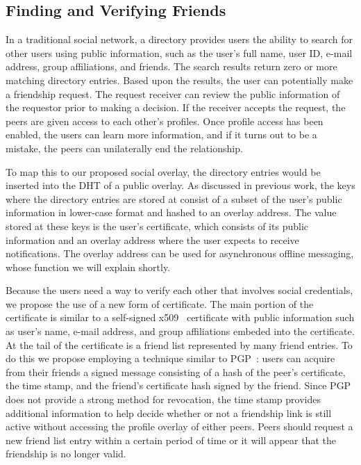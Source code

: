 \documentclass[letterpaper,twocolumn,10pt]{article}
\begin{document}
\subsection{Finding and Verifying Friends}
In a traditional social network, a directory provides users the ability to search
for other users using public information, such as the user's full name, user ID,
e-mail address, group affiliations, and friends.  The search results return zero
or more matching directory entries.  Based upon the results, the user can
potentially make a friendship request.  The request receiver can review the
public information of the requestor prior to making a decision.  If the receiver
accepts the request, the peers are given access to each other's profiles.
Once profile access has been enabled, the users can learn more information, and
if it turns out to be a mistake, the peers can unilaterally end the relationship.

To map this to our proposed social overlay, the directory entries would be
inserted into the DHT of a public overlay.  As discussed in previous work, the
keys where the directory entries are stored at consist of a subset of the user's
public information in lower-case format and hashed to an overlay  address.  The
value stored at these keys is the user's certificate, which consists of its public
information and an overlay address where the user expects to receive
notifications.  The overlay address can be used for asynchronous offline
messaging, whose function we will explain shortly.

Because the users need a way to verify each other that involves social credentials,
we propose the use of a new form of certificate.
The main portion of the certificate is similar to a self-signed
x509~\cite{x509} certificate with public information such as user's name, e-mail
address, and group affiliations embeded into the certificate.  At the tail of
the certificate is a friend list represented by many friend entries.  To do this
we propose employing a technique similar to PGP~\cite{pgp}: users can acquire from their
friends a signed message consisting of a hash of the peer's certificate, the
time stamp, and the friend's certificate hash signed by the friend.  Since PGP
does not provide a strong method for revocation, the time stamp provides
additional information to help decide whether or not a friendship link is still
active without accessing the profile overlay of either peers.  Peers should
request a new friend list entry within a certain period of time or it will
appear that the friendship is no longer valid.
\end{document}
